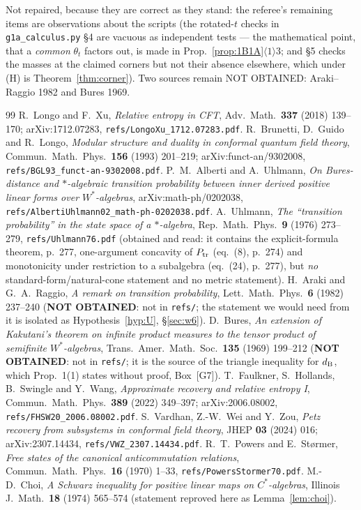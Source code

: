 \documentclass[11pt]{article}
\theoremstyle{definition}\newtheorem{example}[theorem]{Example}
\begin{document}
Not repaired, because they are correct as they stand: the referee's remaining items are
observations about the scripts (the rotated-$t$ checks in \texttt{g1a\_calculus.py} \S4 are
vacuous as independent tests --- the mathematical point, that a \emph{common} $\theta_t$ factors
out, is made in Prop.~\ref{prop:1B1A}$\langle1\rangle3$; and \S5 checks the masses at the claimed
corners but not their absence elsewhere, which under (H) is Theorem~\ref{thm:corner}).  Two
sources remain NOT OBTAINED: Araki--Raggio 1982 and Bures 1969.

\begin{thebibliography}{99}
 R.~Longo and F.~Xu, \emph{Relative entropy in CFT}, Adv.\ Math.\ \textbf{337} (2018) 139--170;
 arXiv:1712.07283, \texttt{refs/LongoXu\_1712.07283.pdf}.
 R.~Brunetti, D.~Guido and R.~Longo, \emph{Modular structure and duality in conformal quantum
 field theory}, Commun.\ Math.\ Phys.\ \textbf{156} (1993) 201--219; arXiv:funct-an/9302008,
 \texttt{refs/BGL93\_funct-an-9302008.pdf}.
 P.~M.~Alberti and A.~Uhlmann, \emph{On Bures-distance and $*$-algebraic transition probability
 between inner derived positive linear forms over $W^*$-algebras}, arXiv:math-ph/0202038,
 \texttt{refs/AlbertiUhlmann02\_math-ph-0202038.pdf}.
 A.~Uhlmann, \emph{The ``transition probability'' in the state space of a $*$-algebra},
 Rep.\ Math.\ Phys.\ \textbf{9} (1976) 273--279, \texttt{refs/Uhlmann76.pdf} (obtained and read:
 it contains the explicit-formula theorem, p.~277, one-argument concavity of $P_{\rm tr}$
 (eq.~(8), p.~274) and monotonicity under restriction to a subalgebra (eq.~(24), p.~277), but
 \emph{no} standard-form/natural-cone statement and no metric statement).
 H.~Araki and G.~A.~Raggio, \emph{A remark on transition probability}, Lett.\ Math.\ Phys.\
 \textbf{6} (1982) 237--240 (\textbf{NOT OBTAINED}: not in \texttt{refs/}; the statement we would
 need from it is isolated as Hypothesis~\ref{hyp:U}, \S\ref{sec:w6}).
\bibitem{Bures69} D.~Bures, \emph{An extension of Kakutani's theorem on infinite product measures to
 the tensor product of semifinite $W^*$-algebras}, Trans.\ Amer.\ Math.\ Soc.\ \textbf{135} (1969)
 199--212 (\textbf{NOT OBTAINED}: not in \texttt{refs/}; it is the source of the triangle
 inequality for $d_{\rm B}$, which \cite{AU02} Prop.~1(1) states without proof, Box~[G7]).
\bibitem{FHSW} T.~Faulkner, S.~Hollands, B.~Swingle and Y.~Wang, \emph{Approximate recovery and relative
 entropy I}, Commun.\ Math.\ Phys.\ \textbf{389} (2022) 349--397; arXiv:2006.08002,
 \texttt{refs/FHSW20\_2006.08002.pdf}.
 S.~Vardhan, Z.-W.~Wei and Y.~Zou, \emph{Petz recovery from subsystems in conformal field
 theory}, JHEP \textbf{03} (2024) 016; arXiv:2307.14434, \texttt{refs/VWZ\_2307.14434.pdf}.
\bibitem{PS70} R.~T.~Powers and E.~St\o rmer, \emph{Free states of the canonical anticommutation relations},
 Commun.\ Math.\ Phys.\ \textbf{16} (1970) 1--33, \texttt{refs/PowersStormer70.pdf}.
\bibitem{Choi74} M.-D.~Choi, \emph{A Schwarz inequality for positive linear maps on $C^*$-algebras},
 Illinois J.\ Math.\ \textbf{18} (1974) 565--574 (statement reproved here as
 Lemma~\ref{lem:choi}).
\end{thebibliography}
\end{document}
